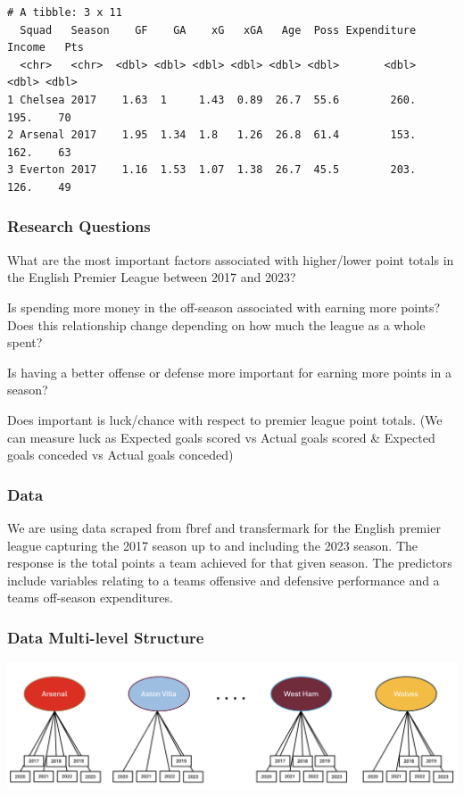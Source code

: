 \documentclass[
  letterpaper,
  DIV=11,
  numbers=noendperiod]{scrartcl}
\begin{document}
\begin{verbatim}
# A tibble: 3 x 11
  Squad   Season    GF    GA    xG   xGA   Age  Poss Expenditure Income   Pts
  <chr>   <chr>  <dbl> <dbl> <dbl> <dbl> <dbl> <dbl>       <dbl>  <dbl> <dbl>
1 Chelsea 2017    1.63  1     1.43  0.89  26.7  55.6        260.   195.    70
2 Arsenal 2017    1.95  1.34  1.8   1.26  26.8  61.4        153.   162.    63
3 Everton 2017    1.16  1.53  1.07  1.38  26.7  45.5        203.   126.    49
\end{verbatim}

\subsubsection{Research Questions}\label{research-questions}

What are the most important factors associated with higher/lower point
totals in the English Premier League between 2017 and 2023?

Is spending more money in the off-season associated with earning more
points? Does this relationship change depending on how much the league
as a whole spent?

Is having a better offense or defense more important for earning more
points in a season?

Does important is luck/chance with respect to premier league point
totals. (We can measure luck as Expected goals scored vs Actual goals
scored \& Expected goals conceded vs Actual goals conceded)

\subsubsection{Data}\label{data}

We are using data scraped from fbref and transfermark for the English
premier league capturing the 2017 season up to and including the 2023
season. The response is the total points a team achieved for that given
season. The predictors include variables relating to a teams offensive
and defensive performance and a teams off-season expenditures.

\subsubsection{Data Multi-level
Structure}\label{data-multi-level-structure}

\includegraphics{images/multi_level_structure.png}
\end{document}

